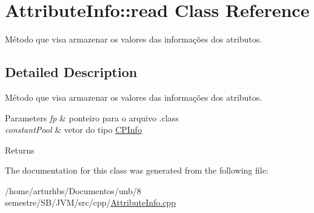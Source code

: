 \hypertarget{classAttributeInfo_1_1read}{}\section{Attribute\+Info\+:\+:read Class Reference}
\label{classAttributeInfo_1_1read}


Método que visa armazenar os valores das informações dos atributos.  




\subsection{Detailed Description}
Método que visa armazenar os valores das informações dos atributos. 


\begin{DoxyParams}{Parameters}
{\em fp} & ponteiro para o arquivo .class \\
\hline
{\em constant\+Pool} & vetor do tipo \hyperlink{classCPInfo}{C\+P\+Info} \\
\hline
\end{DoxyParams}
\begin{DoxyReturn}{Returns}

\end{DoxyReturn}


The documentation for this class was generated from the following file\+:\begin{DoxyCompactItemize}
\item 
/home/arturhbs/\+Documentos/unb/8 semestre/\+S\+B/\+J\+V\+M/src/cpp/\hyperlink{AttributeInfo_8cpp}{Attribute\+Info.\+cpp}\end{DoxyCompactItemize}

